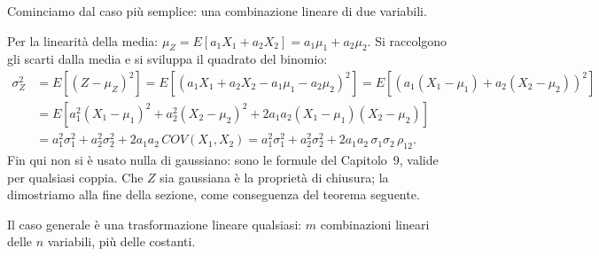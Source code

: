Cominciamo dal caso più semplice: una combinazione lineare di due variabili.


\begin{dimostrazione}
 Per la linearità della media: $\mu_Z = E[a_1 X_1 + a_2 X_2] = a_1 \mu_1 + a_2 \mu_2$.
 Si raccolgono gli scarti dalla media e si sviluppa il quadrato del binomio:
\[ \begin{aligned}
   \sigma_Z^2 &= E[(Z - \mu_Z)^2] = E\left[ (a_1 X_1 + a_2 X_2 - a_1 \mu_1 - a_2 \mu_2)^2 \right] =
   E\left[ \left( a_1 (X_1 - \mu_1) + a_2 (X_2 - \mu_2) \right)^2 \right] \\
   &= E\left[ a_1^2 (X_1 - \mu_1)^2 + a_2^2 (X_2 - \mu_2)^2 + 2 a_1 a_2 (X_1 - \mu_1)(X_2 - \mu_2) \right] \\
   &= a_1^2 \sigma_1^2 + a_2^2 \sigma_2^2 + 2 a_1 a_2\, COV(X_1, X_2) = a_1^2 \sigma_1^2 + a_2^2 \sigma_2^2 + 2 a_1 a_2\,
   \sigma_1 \sigma_2\, \rho_{12} .
   \end{aligned} \]
Fin qui non si è usato nulla di gaussiano: sono le formule del Capitolo~9, valide per qualsiasi coppia.
 Che $Z$ sia gaussiana è la proprietà di chiusura; la dimostriamo alla fine della sezione, come
conseguenza del teorema seguente.
\end{dimostrazione}

Il caso generale è una trasformazione lineare qualsiasi: $m$ combinazioni lineari delle $n$ variabili, più delle
costanti.


